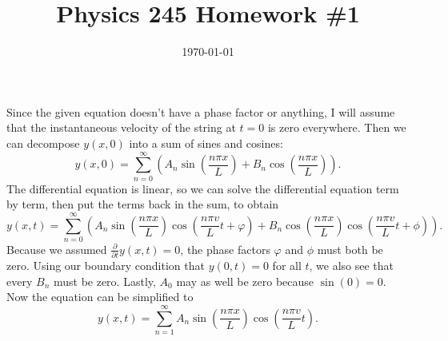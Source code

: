 \documentclass{article}
\date{\today}
\title{Physics 245 Homework \#1}
\begin{document}
\maketitle

\noindent{}\bigskip\par
Since the given equation doesn't have a phase factor or anything, I will assume that the instantaneous velocity of the string at $t=0$ is zero everywhere. Then we can decompose $y(x,0)$ into a sum of sines and cosines:
\[ y(x,0) = \sum_{n=0}^\infty \left( A_n \sin \left( \frac{n \pi x}{L} \right) + B_n \cos \left( \frac{n \pi x}{L} \right) \right). \]
The differential equation is linear, so we can solve the differential equation term by term, then put the terms back in the sum, to obtain
\[ y(x, t) = \sum_{n=0}^\infty \left( A_n \sin \left( \frac{n \pi x}{L} \right) \cos \left( \frac{n \pi v}{L} t + \varphi  \right) + B_n \cos \left( \frac{n \pi x}{L} \right) \cos \left( \frac{n \pi v}{L} t + \phi \right)  \right). \]
Because we assumed $\frac{\partial}{\partial t} y(x, t) = 0$, the phase factors $\varphi$ and $\phi$ must both be zero. Using our boundary condition that $y(0, t)=0$ for all $t$, we also see that every $B_n$ must be zero. Lastly, $A_0$ may as well be zero because $\sin(0)=0$. Now the equation can be simplified to
\[ y(x, t) = \sum_{n=1}^\infty A_n \sin \left( \frac{n \pi x}{L} \right) \cos \left( \frac{n \pi v}{L} t \right). \]
\end{document}
